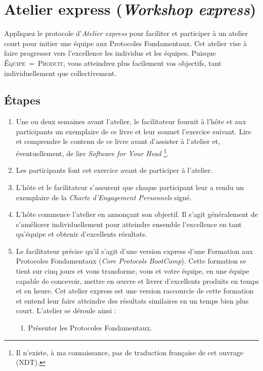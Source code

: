 \documentclass[11pt]{book}
\let\oldsection\section
\renewcommand\section{\clearpage\oldsection}
\begin{document}
\section{Atelier express (\emph{Workshop express})} \label{atelier-express}

Appliquez le protocole d'\emph{Atelier express} pour faciliter et participer à un atelier court pour initier une équipe aux Protocoles Fondamentaux. Cet 
atelier vise à faire progresser vers l'excellence les individus et les équipes. Puisque \textsc{Équipe~=~Produit}, vous atteindrez plus facilement vos
objectifs, tant individuellement que collectivement.

\subsection{Étapes}
\begin{enumerate}
	\item Une ou deux semaines avant l'atelier, le facilitateur fournit à l'hôte et aux participants un exemplaire de ce livre et leur soumet l'exercice suivant. 
	      Lire et comprendre le contenu de ce livre avant d'assister à l'atelier et, éventuellement, de lire \emph{Software for Your Head}
	      \footnote{Il n'existe, à ma connaissance, pas de traduction française de cet ouvrage (NDT).}. 
	\item Les participants font cet exercice avant de participer à l'atelier.
	\item L'hôte et le facilitateur s'assurent que chaque participant leur a rendu un exemplaire de la \emph{Charte d'Engagement Personnels} signé.
	\item L'hôte commence l'atelier en annonçant son objectif. Il s'agit généralement de s'améliorer individuellement pour atteindre ensemble l'excellence en tant
	      qu'équipe et obtenir d'excellents résultats.
	\item Le facilitateur précise qu'il s'agit d'une version \og{}express\fg{} d'une Formation aux Protocoles Fondamentaux (\emph{Core Protocols BootCamp}). Cette 
	      formation se tient sur cinq jours et vous transforme, vous et votre équipe, en une équipe capable de concevoir, mettre en œuvre et livrer d'excellents
	      produits en temps et en heure. Cet atelier express est une version raccourcie de cette formation et entend leur faire atteindre des résultats similaires
	      en un temps bien plus court. L'atelier se déroule ainsi :
	      \begin{enumerate}
	      	\item Présenter les Protocoles Fondamentaux.

\end{enumerate}
\end{enumerate}
\end{document}
